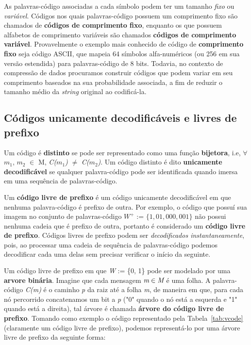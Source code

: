 As palavras-código associadas a cada símbolo podem ter um tamanho \emph{fixo} ou \emph{variável}.
Códigos nos quais palavras-código possuem um comprimento fixo são chamados de \textbf{códigos de comprimento fixo}, enquanto os que possuem alfabetos de comprimento variáveis são chamados \textbf{códigos de comprimento variável}. 
Provavelmente o exemplo mais conhecido de código de \textbf{comprimento fixo} seja código ASCII, que mapeia 64 símbolos alfa-numéricos (ou 256 em sua versão estendida) para palavras-código de 8 bits. 
Todavia, no contexto de compressão de dados procuramos construir códigos que podem variar em seu comprimento baseados na sua probabilidade associada, a fim de reduzir o tamanho médio da \emph{string} original ao codificá-la.

\subsection{Códigos unicamente decodificáveis e livres de prefixo}

Um código é \textbf{distinto} se pode ser representado como uma função \textbf{bijetora}, i.e, $\forall$ $m_1$, $m_2$ $\in$ M, \emph{C($m_1$)} $\neq$ \emph{C($m_2$)}.
Um código distinto é dito \textbf{unicamente decodificável} se qualquer palavra-código pode ser identificada quando imersa em uma sequência de palavras-código.

Um \textbf{código livre de prefixo} é um código unicamente decodificável em que nenhuma palavra-código é prefixo de outra. 
Por exemplo, o código que possuí sua imagem no conjunto de palavras-código \emph{$W^+$} := $\{1, 01, 000, 001\}$ não possui nenhuma cadeia que é prefixo de outra, portanto é considerado um \textbf{código livre de prefixo}.
Códigos livres de prefixo podem ser \emph{decodificados instantaneamente}, pois, ao processar uma cadeia de sequência de palavras-código podemos decodificar cada uma delas sem precisar verificar o início da seguinte.

Um código livre de prefixo em que \emph{W} := \{0, 1\} pode ser modelado por uma \textbf{arvore binária}. 
Imagine que cada mensagem $\emph{m} \in \emph{M}$ é uma folha. A palavra-código \emph{C(m)} é o caminho \emph{p} da raiz até a folha \emph{m}, de maneira em que, para cada nó percorrido concatenamos um bit a \emph{p} ("0" quando o nó está a esquerda e "1" quando está a direita), tal árvore é chamada \textbf{árvore do código livre de prefixo}. Tomando como exemplo o código representado pela Tabela~\ref{tab:vcode} (claramente um código livre de prefixo), podemos representá-lo por uma árvore livre de prefixo da seguinte forma:

